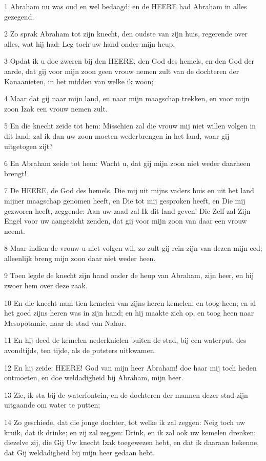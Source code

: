 \par 1 Abraham nu was oud en wel bedaagd; en de HEERE had Abraham in alles gezegend.
\par 2 Zo sprak Abraham tot zijn knecht, den oudste van zijn huis, regerende over alles, wat hij had: Leg toch uw hand onder mijn heup,
\par 3 Opdat ik u doe zweren bij den HEERE, den God des hemels, en den God der aarde, dat gij voor mijn zoon geen vrouw nemen zult van de dochteren der Kanaanieten, in het midden van welke ik woon;
\par 4 Maar dat gij naar mijn land, en naar mijn maagschap trekken, en voor mijn zoon Izak een vrouw nemen zult.
\par 5 En die knecht zeide tot hem: Misschien zal die vrouw mij niet willen volgen in dit land; zal ik dan uw zoon moeten wederbrengen in het land, waar gij uitgetogen zijt?
\par 6 En Abraham zeide tot hem: Wacht u, dat gij mijn zoon niet weder daarheen brengt!
\par 7 De HEERE, de God des hemels, Die mij uit mijns vaders huis en uit het land mijner maagschap genomen heeft, en Die tot mij gesproken heeft, en Die mij gezworen heeft, zeggende: Aan uw zaad zal Ik dit land geven! Die Zelf zal Zijn Engel voor uw aangezicht zenden, dat gij voor mijn zoon van daar een vrouw neemt.
\par 8 Maar indien de vrouw u niet volgen wil, zo zult gij rein zijn van dezen mijn eed; alleenlijk breng mijn zoon daar niet weder heen.
\par 9 Toen legde de knecht zijn hand onder de heup van Abraham, zijn heer, en hij zwoer hem over deze zaak.
\par 10 En die knecht nam tien kemelen van zijns heren kemelen, en toog heen; en al het goed zijns heren was in zijn hand; en hij maakte zich op, en toog heen naar Mesopotamie, naar de stad van Nahor.
\par 11 En hij deed de kemelen nederknielen buiten de stad, bij een waterput, des avondtijds, ten tijde, als de putsters uitkwamen.
\par 12 En hij zeide: HEERE! God van mijn heer Abraham! doe haar mij toch heden ontmoeten, en doe weldadigheid bij Abraham, mijn heer.
\par 13 Zie, ik sta bij de waterfontein, en de dochteren der mannen dezer stad zijn uitgaande om water te putten;
\par 14 Zo geschiede, dat die jonge dochter, tot welke ik zal zeggen: Neig toch uw kruik, dat ik drinke; en zij zal zeggen: Drink, en ik zal ook uw kemelen drenken; diezelve zij, die Gij Uw knecht Izak toegewezen hebt, en dat ik daaraan bekenne, dat Gij weldadigheid bij mijn heer gedaan hebt.
